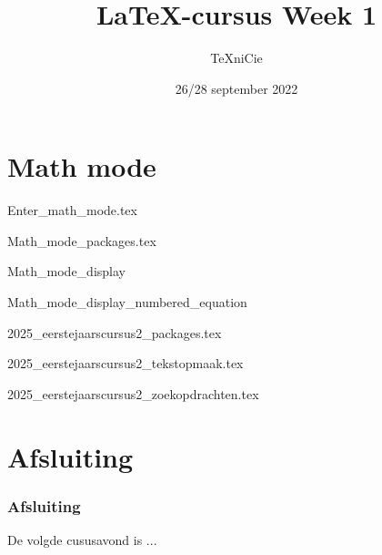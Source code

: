 \documentclass[allauthors,dutch]{../../cursuspresentatie3}
\title{\LaTeX{}-cursus Week 1}
\author{\TeX niCie}
\date{26/28 september 2022}
\def\importslide#1#2{%
	{#2}
}
\def\importslidej#1#2{%
	{#2}
}
\begin{document}
\section{Math mode}

\importslide{2025-eerstejaars_cursus_1}{Enter_math_mode.tex}
\importslide{2025-eerstejaars_cursus_1}{Math_mode_packages.tex}
\importslide{2025-eerstejaars_cursus_1}{Math_mode_display}
\importslide{2025-eerstejaars_cursus_1}{Math_mode_display_numbered_equation}

\importslidej{cursus2}{2025_eerstejaarscursus2_packages.tex}
\importslidej{cursus2}{2025_eerstejaarscursus2_tekstopmaak.tex}
\importslidej{cursus2}{2025_eerstejaarscursus2_zoekopdrachten.tex}

\section{Afsluiting}
\begin{frame}
	\frametitle{Afsluiting}
	
	De volgde cususavond is ...
\end{frame}
	
\end{document}
